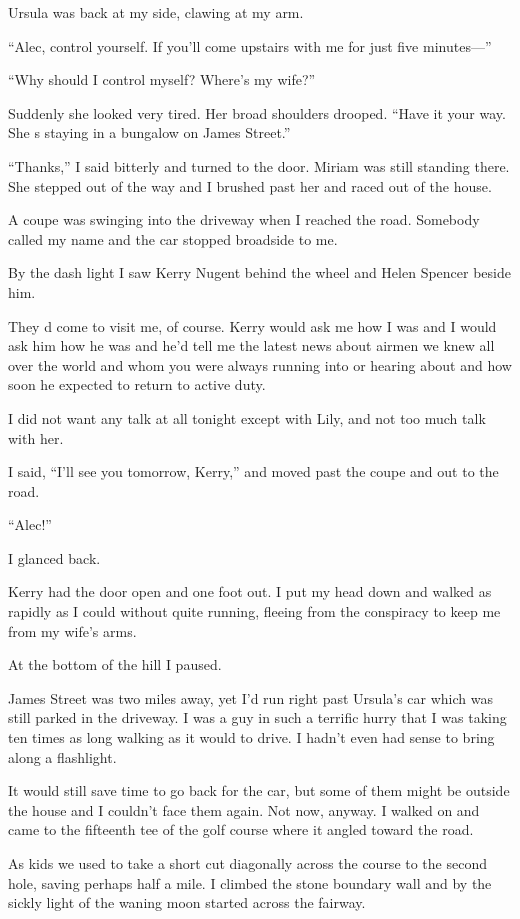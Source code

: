 \documentclass{novel}
\begin{document}
Ursula was back at my side, clawing at my arm. 

“Alec, control yourself. If you’ll come upstairs with me for just five minutes—”

“Why should I control myself? Where’s my wife?”

Suddenly she looked very tired. Her broad shoulders drooped. “Have it your way. She s staying in a bungalow on James Street.”

“Thanks,” I said bitterly and turned to the door. Miriam was still standing there. She stepped out of the way and I brushed past her and raced out of the house.

A coupe was swinging into the driveway when I reached the road. Somebody called my name and the car stopped broadside to me. 

By the dash light I saw Kerry Nugent behind the wheel and Helen Spencer beside him.

They d come to visit me, of course. Kerry would ask me how I was and I would ask him how he was and he’d tell me the latest news about airmen we knew all over the world and whom you were always running into or hearing about and how soon he expected to return to active duty. 

I did not want any talk at all tonight except with Lily, and not too much talk with her.

I said, “I’ll see you tomorrow, Kerry,” and moved past the coupe and out to the road.

“Alec!”

I glanced back. 

Kerry had the door open and one foot out. I put my head down and walked as rapidly as I could without quite running, fleeing from the conspiracy to keep me from my wife’s arms.

\scenestars

At the bottom of the hill I paused.

James Street was two miles away, yet I’d run right past Ursula’s car which was still parked in the driveway. I was a guy in such a terrific hurry that I was taking ten times as long walking as it would to drive. I hadn’t even had sense to bring along a flashlight.

It would still save time to go back for the car, but some of them might be outside the house and I couldn’t face them again. Not now, anyway. I walked on and came to the fifteenth tee of the golf course where it angled toward the road. 

As kids we used to take a short cut diagonally across the course to the second hole, saving perhaps half a mile. I climbed the stone boundary wall and by the sickly light of the waning moon started across the fairway.
\end{document}
